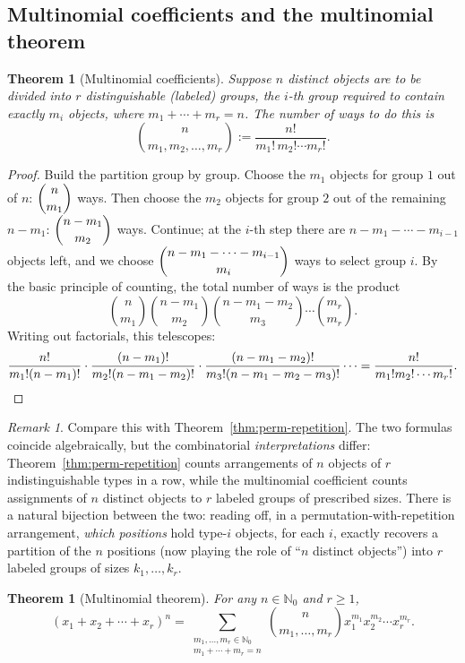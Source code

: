 \documentclass[11pt]{article}
\theoremstyle{definition}
\theoremstyle{plain}
\newtheorem{theorem}[definition]{Theorem}
\theoremstyle{remark}
\newtheorem{remark}[definition]{Remark}
\newcommand{\Nz}{\mathbb{N}_0}
\begin{document}
\subsection{Multinomial coefficients and the multinomial theorem}

\begin{theorem}[Multinomial coefficients]
Suppose $n$ \emph{distinct} objects are to be divided into $r$ \emph{distinguishable} (labeled)
groups, the $i$-th group required to contain exactly $m_i$ objects, where $m_1+\cdots+m_r=n$. The
number of ways to do this is
\[
\binom{n}{m_1,m_2,\dots,m_r} := \frac{n!}{m_1!\,m_2!\cdots m_r!}.
\]
\end{theorem}

\begin{proof}
Build the partition group by group. Choose the $m_1$ objects for group $1$ out of $n$:
$\dbinom{n}{m_1}$ ways. Then choose the $m_2$ objects for group $2$ out of the remaining $n-m_1$:
$\dbinom{n-m_1}{m_2}$ ways. Continue; at the $i$-th step there are $n - m_1 - \cdots - m_{i-1}$
objects left, and we choose $\dbinom{n-m_1-\cdots-m_{i-1}}{m_i}$ ways to select group $i$. By the
basic principle of counting, the total number of ways is the product
\[
\binom{n}{m_1}\binom{n-m_1}{m_2}\binom{n-m_1-m_2}{m_3}\cdots\binom{m_r}{m_r}.
\]
Writing out factorials, this telescopes:
\[
\frac{n!}{m_1!(n-m_1)!}\cdot\frac{(n-m_1)!}{m_2!(n-m_1-m_2)!}\cdot
\frac{(n-m_1-m_2)!}{m_3!(n-m_1-m_2-m_3)!}\cdots = \frac{n!}{m_1!m_2!\cdots m_r!}. \qedhere
\]
\end{proof}

\begin{remark}
Compare this with Theorem~\ref{thm:perm-repetition}. The two formulas coincide algebraically, but
the combinatorial \emph{interpretations} differ: Theorem~\ref{thm:perm-repetition} counts
arrangements of $n$ objects of $r$ indistinguishable types in a row, while the multinomial
coefficient counts assignments of $n$ distinct objects to $r$ labeled groups of prescribed sizes.
There is a natural bijection between the two: reading off, in a permutation-with-repetition
arrangement, \emph{which positions} hold type-$i$ objects, for each $i$, exactly recovers a
partition of the $n$ positions (now playing the role of ``$n$ distinct objects'') into $r$ labeled
groups of sizes $k_1,\dots,k_r$.
\end{remark}

\begin{theorem}[Multinomial theorem]
For any $n \in \Nz$ and $r \ge 1$,
\[
(x_1+x_2+\cdots+x_r)^n = \sum_{\substack{m_1,\dots,m_r \in \Nz \\ m_1+\cdots+m_r = n}}
\binom{n}{m_1,\dots,m_r} x_1^{m_1}x_2^{m_2}\cdots x_r^{m_r}.
\]
\end{theorem}
\end{document}
